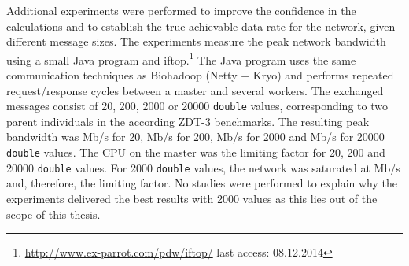 
 

Additional experiments were performed to improve the confidence in the calculations and to establish the true achievable data rate for the network, given different message sizes. The experiments measure the peak network bandwidth using a small Java program and iftop.\footnote{\url{http://www.ex-parrot.com/pdw/iftop/} last access: 08.12.2014} The Java program uses the same communication techniques as Biohadoop (Netty + Kryo) and performs repeated request/response cycles between a master and several workers. The exchanged messages consist of 20, 200, 2000 or 20000 \texttt{double} values, corresponding to two parent individuals in the according ZDT-3 benchmarks. The resulting peak bandwidth was \unit[134]{Mb/s} for 20, \unit[489]{Mb/s} for 200, \unit[901]{Mb/s} for 2000 and \unit[552]{Mb/s} for 20000 \texttt{double} values. The CPU on the master was the limiting factor for 20, 200 and 20000 \texttt{double} values. For 2000 \texttt{double} values, the network was saturated at \unit[901]{Mb/s} and, therefore, the limiting factor. No studies were performed to explain why the experiments delivered the best results with 2000 values as this lies out of the scope of this thesis.

